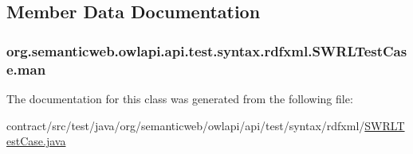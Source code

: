 \subsection{Member Data Documentation}
\hypertarget{classorg_1_1semanticweb_1_1owlapi_1_1api_1_1test_1_1syntax_1_1rdfxml_1_1_s_w_r_l_test_case_ac983dd675c07883a2a49cd3bd8948f50}{
\subsubsection[{man}]{ org.\-semanticweb.\-owlapi.\-api.\-test.\-syntax.\-rdfxml.\-S\-W\-R\-L\-Test\-Case.\-man\hspace{0.3cm}{\ttfamily [private]}}}\label{classorg_1_1semanticweb_1_1owlapi_1_1api_1_1test_1_1syntax_1_1rdfxml_1_1_s_w_r_l_test_case_ac983dd675c07883a2a49cd3bd8948f50}


The documentation for this class was generated from the following file\-:\begin{DoxyCompactItemize}
\item 
contract/src/test/java/org/semanticweb/owlapi/api/test/syntax/rdfxml/\hyperlink{_s_w_r_l_test_case_8java}{S\-W\-R\-L\-Test\-Case.\-java}\end{DoxyCompactItemize}
